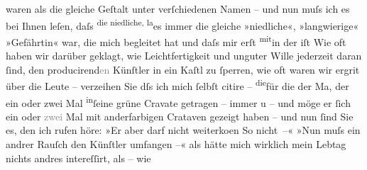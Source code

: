 \begin{ledgroupsized}[t]{13cm}
               waren als die gleiche Geſtalt unter verſchiedenen Na{\pb}men – und nun muſs ich es bei Ihnen \strikeout{\textcolor{gray}{wied}} leſen, daſs \substVorne{}\textsuperscript{die niedliche, la}{\allowbreak}\substDazwischen{}es\substHinten{} immer die gleiche »niedliche«, »langwierige« »Gefährtin« war, die mich
               begleitet hat und daſs  mir erſt \substVorne{}\textsuperscript{mit}\substDazwischen{}in\substHinten{} der \label{T_L02988-2v}\label{T_L02988-2h} iſt{\dotstwo} Wie oft haben wir darüber geklagt, wie Leichtfertigkeit
               und unguter Wille jederzeit daran ſind, den producirend\textcolor{gray}{en}{ }{\pb}Künſtler in ein Kaſtl zu ſperren, wie oft
               waren wir ergri{\geminationm}t\strikeout{,} über
               die Leute – verzeihen Sie dſs ich mich ſelbſt citire – \substVorne{}\textsuperscript{die}\substDazwischen{}fü\substHinten{}r die der Ma{\geminationn}, der ein oder zwei Mal \substVorne{}\textsuperscript{in}\substDazwischen{}ſe\substHinten{}ine grüne Cravate getragen – immer u \label{T_L02988-3v}\label{T_L02988-3h} – und möge er ſich ein oder
                  \textcolor{gray}{zwei} Mal mit anderfarbigen Crataven gezeigt haben – und nun
               ſind Sie es, den {\pb}ich rufen höre: »Er aber
               darf nicht weiterko{\geminationm}en {\dotstwo} So
               nicht –« »Nun muſs ein andrer Rauſch den Künſtler umfangen –« als hätte mich wirklich
               mein Lebtag nichts andres intereſſirt, als – wie \label{K_L02988-55v}
\end{ledgroupsized}
